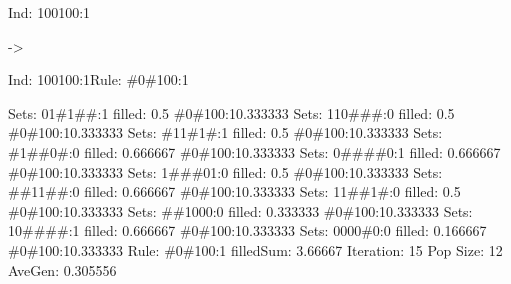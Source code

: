 \documentclass[12pt,openright,twoside,letterpaper,english,brazil,sumario=tradicional]{abntex2}
\begin{document}
\begin{flushleft}\ttfamily
\par Ind: 100100:1\end{flushleft} -> \begin{flushleft}\ttfamily
\par Ind: 100100:1Rule: \#0\#100:1
\end{flushleft}  Sets:	01\#1\#\#:1 filled: 0.5 \#0\#100:1{0.333333}
  Sets:	110\#\#\#:0 filled: 0.5 \#0\#100:1{0.333333}
  Sets:	\#11\#1\#:1 filled: 0.5 \#0\#100:1{0.333333}
  Sets:	\#1\#\#0\#:0 filled: 0.666667 \#0\#100:1{0.333333}
  Sets:	0\#\#\#\#0:1 filled: 0.666667 \#0\#100:1{0.333333}
  Sets:	1\#\#\#01:0 filled: 0.5 \#0\#100:1{0.333333}
  Sets:	\#\#11\#\#:0 filled: 0.666667 \#0\#100:1{0.333333}
  Sets:	11\#\#1\#:0 filled: 0.5 \#0\#100:1{0.333333}
  Sets:	\#\#1000:0 filled: 0.333333 \#0\#100:1{0.333333}
  Sets:	10\#\#\#\#:1 filled: 0.666667 \#0\#100:1{0.333333}
  Sets:	0000\#0:0 filled: 0.166667 \#0\#100:1{0.333333}
Rule:	\#0\#100:1
filledSum: 3.66667
Iteration: 15 Pop Size: 12 AveGen: 0.305556
\end{document}
